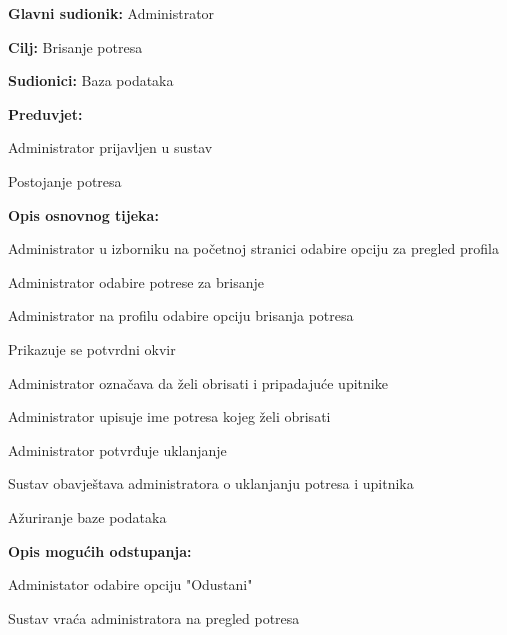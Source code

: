 			\noindent {}
			\begin{packed_item}

				\item \textbf{Glavni sudionik:} Administrator
				\item \textbf{Cilj:} Brisanje potresa
				\item \textbf{Sudionici:} Baza podataka
				\item \textbf{Preduvjet:}
					\begin{packed_item}
						\item Administrator prijavljen u sustav
						\item Postojanje potresa
					\end{packed_item}
				\item \textbf{Opis osnovnog tijeka:}
				
				\item[] \begin{packed_enum}

					\item Administrator u izborniku na početnoj stranici odabire opciju za pregled profila
					\item Administrator odabire potrese za brisanje
					\item Administrator na profilu odabire opciju brisanja potresa
					\item Prikazuje se potvrdni okvir
					\item Administrator označava da želi obrisati i pripadajuće upitnike
					\item Administrator upisuje ime potresa kojeg želi obrisati
					\item Administrator potvrđuje uklanjanje
					\item Sustav obavještava administratora o uklanjanju potresa i upitnika
					\item Ažuriranje baze podataka
					
				\end{packed_enum}
				
				\item  \textbf{Opis mogućih odstupanja:}
				
				\item[] \begin{packed_item}
				 
					\item[7.a] Administator odabire opciju "Odustani"
					\item[] \begin{packed_enum}
						
						\item Sustav vraća administratora na pregled potresa
						
						\end{packed_enum}
					
				\end{packed_item}
			\end{packed_item}

